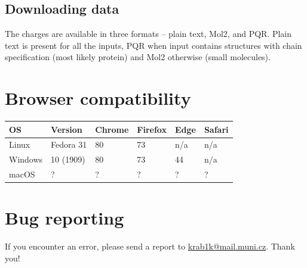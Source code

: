\documentclass[oneside]{memoir}
\begin{document}
\subsection*{Downloading data}
The charges are available in three formats – plain text, Mol2, and PQR. Plain text is present for all the inputs, PQR when input contains structures with chain specification (most likely protein) and Mol2 otherwise (small molecules).

\section*{Browser compatibility}

\begin{tabular}{llllll}
\toprule
OS & Version & Chrome & Firefox & Edge & Safari\\
\midrule
Linux & Fedora 31 & 80 & 73 & n/a & n/a\\
Windows & 10 (1909) & 80 & 73 & 44 & n/a\\
macOS & ? & ? & ? & ? & ?\\
\bottomrule

\end{tabular}

\section*{Bug reporting}
If you encounter an error, please send a report to \href{mailto:krab1k@mail.muni.cz}{krab1k@mail.muni.cz}. Thank you!
\end{document}
